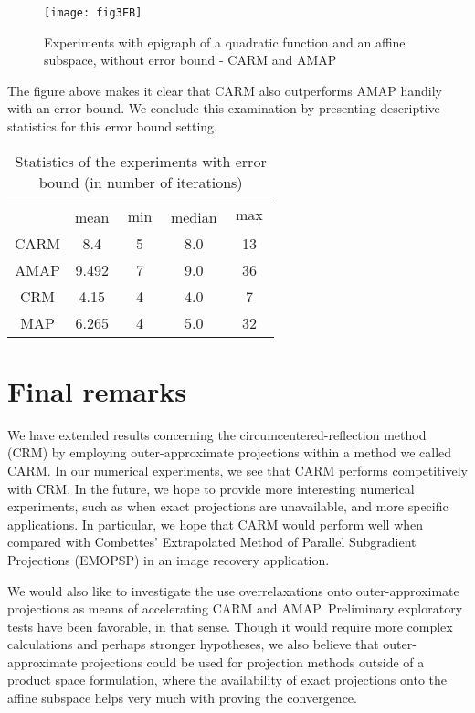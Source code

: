 \documentclass[smallextended,numbook,nospthms]{svjour3}
\theoremstyle{plain}
\theoremstyle{definition}
\begin{document}
\begin{figure}[h!]
	\centering
	\texttt{[image: fig3EB]}
	\caption{Experiments with epigraph of a quadratic function and an affine subspace, without error bound - CARM and AMAP}
	\label{fig:perprof EB 3}
\end{figure}

The figure above makes it clear that CARM also outperforms AMAP handily with an error bound. We conclude this examination by presenting descriptive statistics for this error bound setting.

\begin{table}[h!]
	\centering
	\begin{tabular}{ccccc}
		\hline & mean & $\min$ & median & $\max$ \\
		\cline { 2 - 5 } CARM & 8.4 & 5 & 8.0 & 13 \\
		AMAP & 9.492 & 7 & 9.0 & 36 \\
		CRM & 4.15 & 4 & 4.0 & 7 \\
		MAP & 6.265 & 4 & 5.0 & 32 \\
		\hline
	\end{tabular}
	\caption{Statistics of the experiments with error bound (in number of iterations)}
	\label{table:perprof EB}
\end{table}

\newpage
\section{Final remarks}\label{sec:remarks}

We have extended results concerning the circumcentered-reflection method (CRM) by employing outer-approximate projections within a method we called CARM. In our numerical experiments, we see that CARM performs competitively with CRM. In the future, we hope to provide more interesting numerical experiments, such as when exact projections are unavailable, and more specific applications. In particular, we hope that CARM would perform well when compared with Combettes' Extrapolated Method of Parallel Subgradient Projections (EMOPSP) \cite{Combettes:1996} in an image recovery application.

We would also like to investigate the use overrelaxations onto outer-approximate projections as means of accelerating CARM and AMAP. Preliminary exploratory tests have been favorable, in that sense. Though it would require more complex calculations and perhaps stronger hypotheses, we also believe that outer-approximate projections could be used for projection methods outside of a product space formulation, where the availability of exact projections onto the affine subspace helps very much with proving the convergence.

\newpage




\end{document}
